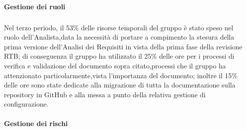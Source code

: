 \paragraph{Gestione dei ruoli}
\subparagraph{}
Nel terzo periodo, il 53\% delle risorse temporali del gruppo è stato speso nel ruolo dell'Analista,data la necessità 
di portare a compimento la stesura della prima versione dell'Analisi dei Requisiti in vista della prima fase della revisione
RTB; di conseguenza il gruppo ha utilizzato il 25\% delle ore per i processi di verifica e validazione del documento sopra citato,processi che il 
gruppo ha attenzionato particolarmente,vista l'importanza del documento; inoltre il 15\% delle ore sono state dedicate alla
migrazione di tutta la documentazione sulla repository in GitHub e alla messa a punto della relativa gestione di configurazione.

\paragraph{Gestione dei rischi}

